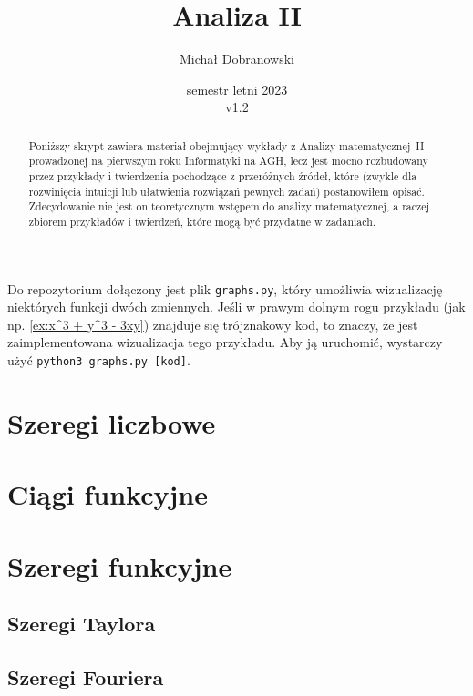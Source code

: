 \documentclass[11pt]{scrartcl}
\title{Analiza II}
\author{Michał Dobranowski}
\date{semestr letni 2023 \\ v1.2}
\begin{document}
    \maketitle
    \begin{abstract}
        \noindent Poniższy skrypt zawiera materiał obejmujący wykłady z Analizy matematycznej~II prowadzonej na pierwszym roku Informatyki na AGH, lecz jest mocno rozbudowany przez przykłady i twierdzenia pochodzące z przeróżnych źródeł, które (zwykle dla rozwinięcia intuicji lub ułatwienia rozwiązań pewnych zadań) postanowiłem opisać. Zdecydowanie nie jest on teoretycznym wstępem do analizy matematycznej, a raczej zbiorem przykładów i twierdzeń, które mogą być przydatne w zadaniach.
    \end{abstract}
    \vspace*{\fill}
    {\footnotesize\doclicenseThis}
    \newpage

    \tableofcontents
    \newpage

    Do repozytorium dołączony jest plik \texttt{graphs.py}, który umożliwia wizualizację niektórych funkcji dwóch zmiennych. Jeśli w prawym dolnym rogu przykładu (jak np. \ref{ex:x^3 + y^3 - 3xy}) znajduje się trójznakowy kod, to znaczy, że jest zaimplementowana wizualizacja tego przykładu. Aby ją uruchomić, wystarczy użyć \texttt{python3 graphs.py [kod]}.

    \section{Szeregi liczbowe}
    

    \section{Ciągi funkcyjne}
    

    \section{Szeregi funkcyjne}
    
        \subsection{Szeregi Taylora}
        
        \subsection{Szeregi Fouriera}
        
\end{document}
